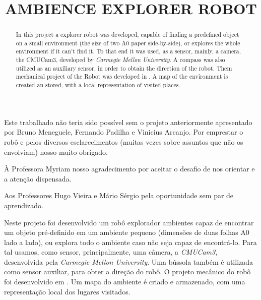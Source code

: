 \documentclass[oneside]{normas-utf-tex} %
\title{\MakeUppercase{Ambience Explorer Robot}} %
\begin{document}
\capa %
\folhaderosto %


\begin{agradecimentos}
Este trabalhado não teria sido possível sem o projeto anteriormente apresentado por Bruno Meneguele, Fernando Padilha e Vinicius Arcanjo.
Por emprestar o robô e pelos diversos esclarecimentos (muitas vezes sobre assuntos que não os envolviam) nosso muito obrigado.

À Professora Myriam nosso agradecimento por aceitar o desafio de nos orientar e a atenção dispensada. 

Aos Professores Hugo Vieira e Mário Sérgio pela oportunidade sem par de aprendizado.
 
\end{agradecimentos}


\begin{resumo}
Neste projeto foi desenvolvido um robô explorador ambientes capaz de encontrar um objeto pré-definido em um ambiente pequeno (dimensões de duas folhas A0 lado a lado), ou explora todo o ambiente caso não seja capaz de encontrá-lo. Para tal usamos, como sensor, principalmente, uma câmera, a \textit{CMUCam3}, desenvolvida pela \textit{Carmegie Mellon University}. Uma bússola também é utilizada como sensor auxiliar, para obter a direção do robô. O projeto mecânico do robô foi desenvolvido em \cite{Robo2d}. Um mapa do ambiente é criado e armazenado, com uma representação local dos lugares visitados.
\end{resumo}

\begin{abstract}
In this project a explorer robot was developed, capable of finding a predefined object on a small environment (the size of two A0 paper side-by-side), or explores the whole environment if it can't find it. To that end it was used, as a sensor, mainly, a camera, the CMUCam3, developed by \textit{Carmegie Mellon University}. A compass was also utilized as an auxiliary sensor, in order to obtain the direction of the robot. Them mechanical project of the Robot was developed in \cite{Robo2d}. A map of the environment is created an stored, with a local representation of visited places.
\end{abstract}
\end{document}
